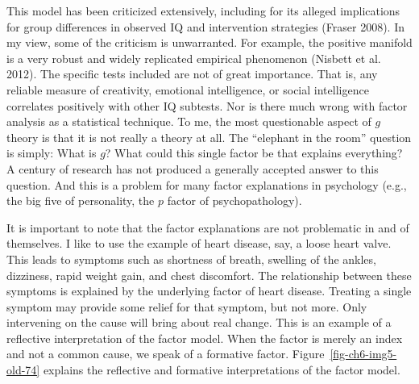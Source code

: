 \documentclass[
  a4paper,
  DIV=11,
  numbers=noendperiod,
  oneside]{scrreprt}
\begin{document}
This model has been criticized extensively, including for its alleged
implications for group differences in observed IQ and intervention
strategies (Fraser 2008). In my view, some of the criticism is
unwarranted. For example, the positive manifold is a very robust and
widely replicated empirical phenomenon (Nisbett et al. 2012). The
specific tests included are not of great importance. That is, any
reliable measure of creativity, emotional intelligence, or social
intelligence correlates positively with other IQ subtests. Nor is there
much wrong with factor analysis as a statistical technique. To me, the
most questionable aspect of \(g\) theory is that it is not really a
theory at all. The ``elephant in the room'' question is simply: What is
\(g\)? What could this single factor be that explains everything? A
century of research has not produced a generally accepted answer to this
question. And this is a problem for many factor explanations in
psychology (e.g., the big five of personality, the \(p\) factor of
psychopathology).

It is important to note that the factor explanations are not problematic
in and of themselves. I like to use the example of heart disease, say, a
loose heart valve. This leads to symptoms such as shortness of breath,
swelling of the ankles, dizziness, rapid weight gain, and chest
discomfort. The relationship between these symptoms is explained by the
underlying factor of heart disease. Treating a single symptom may
provide some relief for that symptom, but not more. Only intervening on
the cause will bring about real change. This is an example of a
reflective interpretation of the factor model. When the factor is merely
an index and not a common cause, we speak of a formative factor.
Figure~\ref{fig-ch6-img5-old-74} explains the reflective and formative
interpretations of the factor model.
\end{document}

